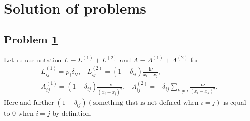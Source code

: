 \documentclass[12pt]{article}
\numberwithin{equation}{section}
\theoremstyle{definition}
\newcommand {\ii} {\mathrm{i}}
\newcommand{\myhref}[2]{\hyperref[#1]{#2}}%
\begin{document}
\section{Solution of problems}
\subsection{Problem \myhref{prob1}{1}}
Let us use notation $L = L^{(1)} + L^{(2)}$ and $A = A^{(1)} + A^{(2)}$ for
\begin{align*}
    &L^{(1)}_{ij} = p_i \delta_{ij}, \;\;\;L^{(2)}_{ij}=(1 - \delta_{ij}) \frac{{\ii}\nu}{x_i - x_j}, \\
    &A^{(1)}_{ij} = (1 - \delta_{ij})\frac{{\ii}\nu}{(x_i - x_j)^2}, \;\;\; A^{(2)}_{ij} = - \delta_{ij} \sum\limits_{k \neq i} \frac{{\ii}\nu }{(x_i - x_k)^2}.
\end{align*}
Here and further $(1 - \delta_{ij})(\text{something that is not defined when } i=j)$ is equal to $0$ when $i=j$ by definition.
\end{document}
